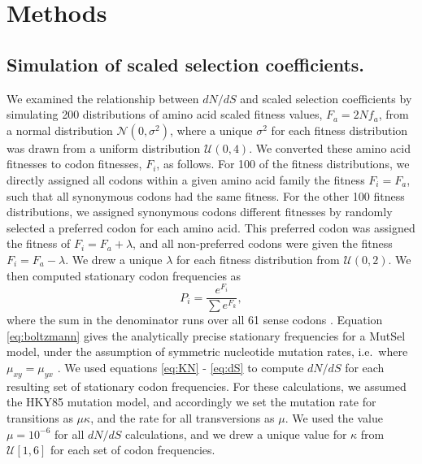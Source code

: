\documentclass[11pt]{article}
\begin{document}
\section*{Methods}

\subsection*{Simulation of scaled selection coefficients.}

We examined the relationship between $dN/dS$ and scaled selection coefficients by simulating 200 distributions of amino acid scaled fitness values, $F_a = 2Nf_a$, from a normal distribution $\mathcal{N}(0,\sigma^2)$, where a unique $\sigma^2$ for each fitness distribution was drawn from a uniform distribution $\mathcal{U}(0,4)$. We converted these amino acid fitnesses to codon fitnesses, $F_i$, as follows. For 100 of the fitness distributions, we directly assigned all codons within a given amino acid family the fitness $F_i = F_a$, such that all synonymous codons had the same fitness. For the other 100 fitness distributions, we assigned synonymous codons different fitnesses by randomly selected a preferred codon for each amino acid. This preferred codon was assigned the fitness of $F_i = F_a + \lambda$, and all non-preferred codons were given the fitness $F_i = F_a - \lambda$. We drew a unique $\lambda$ for each fitness distribution from $\mathcal{U}(0,2)$. 
We then computed stationary codon frequencies as 
\begin{equation}\label{eq:boltzmann}
P_i = \frac{e^{F_i}}{\sum e^{F_k}}, 
\end{equation} where the sum in the denominator runs over all 61 sense codons \cite{SellaHirsh2005}. Equation \eqref{eq:boltzmann} gives the analytically precise stationary frequencies for a MutSel model, under the assumption of symmetric nucleotide mutation rates, i.e.\ where $\mu_{xy} = \mu_{yx}$ \cite{SellaHirsh2005}. We used equations \eqref{eq:KN} - \eqref{eq:dS} to compute $dN/dS$ for each resulting set of stationary codon frequencies. For these calculations, we assumed the HKY85 \cite{HKY85} mutation model, and accordingly we set the mutation rate for transitions as $\mu\kappa$, and the rate for all transversions as $\mu$. We used the value $\mu = 10^{-6}$ for all $dN/dS$ calculations, and we drew a unique value for $\kappa$ from $\mathcal{U}[1,6]$ for each set of codon frequencies.
\end{document}
